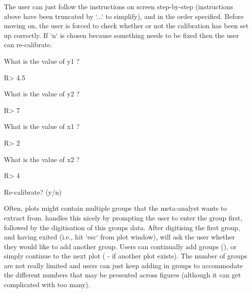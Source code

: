 \documentclass[article]{jss}
\newcommand{\fct}[1]{\code{#1()}}
\begin{document}
The user can just follow the instructions on screen step-by-step (instructions above have been truncated by `...` to simplify), and in the order specified. Before moving on, the user is forced to check whether or not the calibration has been set up correctly. If `n` is chosen because something needs to be fixed then the user can re-calibrate.

\begin{CodeChunk}
\begin{CodeOutput}
What is the value of y1 ?
\end{CodeOutput}
\begin{CodeInput}
R> 4.5
\end{CodeInput}
\begin{CodeOutput}
What is the value of y2 ?
\end{CodeOutput}
\begin{CodeInput}
R> 7
\end{CodeInput}
\begin{CodeOutput}
What is the value of x1 ?
\end{CodeOutput}
\begin{CodeInput}
R> 2
\end{CodeInput}
\begin{CodeOutput}
What is the value of x2 ?
\end{CodeOutput}
\begin{CodeInput}
R> 4
\end{CodeInput}
\begin{CodeOutput}
Re-calibrate? (y/n) 
\end{CodeOutput}
\end{CodeChunk}

Often, plots might contain multiple groups that the meta-analyst wants to extract from. \fct{metaDigitise} handles this nicely by prompting the user to enter the group first, followed by the digitisation of this groups data. After digitising the first group, and having exited (i.e., hit `esc` from plot window), \fct{metaDigitise} will ask the user whether they would like to add another group. Users can continually add groups (), or simply continue to the next plot ( - if another plot exists). 
The number of groups are not really limited and users can just keep adding in groups to accommodate the different numbers that may be presented across figures (although it can get complicated with too many).
\end{document}

